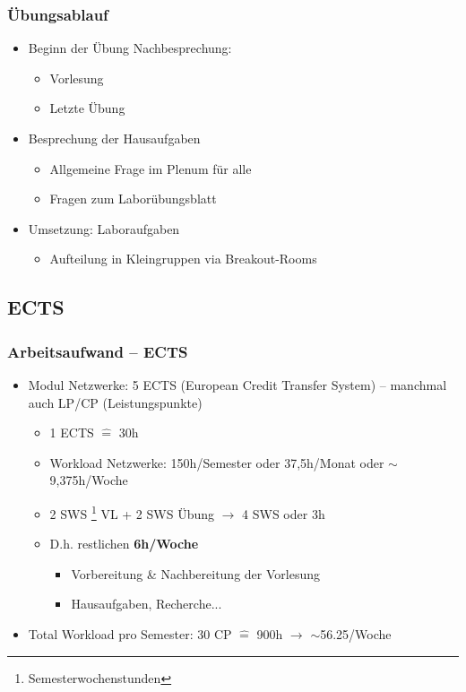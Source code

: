 \documentclass[xcolor=dvipsnames,aspectratio=169]{beamer}
\begin{document}
\begin{frame}
	\frametitle{Übungsablauf}
	\begin{itemize}
		\item Beginn der Übung Nachbesprechung:
		\begin{itemize}
			\item Vorlesung
			\item Letzte Übung
		\end{itemize}
		\item Besprechung der Hausaufgaben
		\begin{itemize}
			\item Allgemeine Frage im Plenum für alle
			\item Fragen zum Laborübungsblatt
		\end{itemize}
		\item Umsetzung: Laboraufgaben
		\begin{itemize}
			\item Aufteilung in Kleingruppen via Breakout-Rooms
		\end{itemize}
	\end{itemize}
\end{frame}

\subsection{ECTS}
\begin{frame}
	\frametitle{Arbeitsaufwand -- ECTS}
	\begin{itemize}
		\item Modul Netzwerke: 5 ECTS (European Credit Transfer System) -- manchmal auch LP/CP (Leistungspunkte)
			\begin{itemize}
				\item 1 ECTS $\widehat{=}$ 30h
				\item Workload Netzwerke: 150h/Semester oder 37,5h/Monat oder $\sim$ 9,375h/Woche
				\item 2 SWS \footnote{Semesterwochenstunden} VL + 2 SWS Übung $\rightarrow$ 4 SWS oder 3h
				\item D.h. restlichen \textbf{6h/Woche}
				\begin{itemize}
					\item Vorbereitung \& Nachbereitung der Vorlesung
					\item Hausaufgaben, Recherche...
				\end{itemize}
			\end{itemize}
			\item Total Workload pro Semester: 30 CP $\widehat{=}$ 900h $\rightarrow$  $\sim$56.25/Woche
	\end{itemize}
\end{frame}
\end{document}
